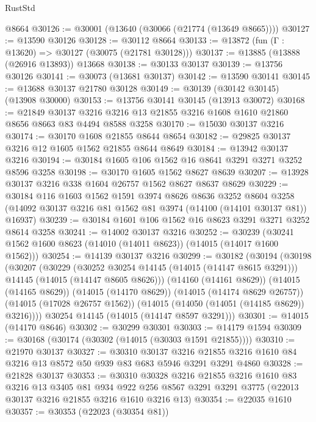 \begin{lexlean}{RustStd}
\begin{coremodule}
    @8664
@30126 := @30001 (@13640 (@30066 (@21774 (@13649 @8665))))
@30127 := @13590 @30126
@30128 := @30112 @8664
@30133 := @13872 (fun (Γ : @13620) => @30127 (@30075 (@21781 @30128)))
@30137 := @13885 (@13888 (@26916 @13893)) @13668
@30138 := @30133 @30137
@30139 := @13756 @30126
@30141 := @30073 (@13681 @30137)
@30142 := @13590 @30141
@30145 := @13688 @30137 @21780 @30128
@30149 := @30139 (@30142 @30145) (@13908 @30000)
@30153 := @13756 @30141 @30145 (@13913 @30072)
@30168 := @21849
    @30137
    @3216
    @3216
    @13
    @21855
    @3216
    @1608
    @1610
    @21860
    @8656
    @8663
    @83
    @4494
    @8588
    @3258
@30170 := @15030 @30137 @3216
@30174 := @30170 @1608 @21855 @8644 @8654
@30182 := @29825 @30137 @3216 @12 @1605 @1562 @21855 @8644 @8649
@30184 := @13942 @30137 @3216
@30194 := @30184 @1605 @106 @1562 @16 @8641 @3291 @3271 @3252 @8596 @3258
@30198 := @30170 @1605 @1562 @8627 @8639
@30207 := @13928 @30137 @3216 @338 @1604 @26757 @1562 @8627 @8637 @8629
@30229 := @30184
    @116
    @1603
    @1562
    @1591
    @3974
    @8626
    @8636
    @3252
    @8604
    @3258
    (@14092 @30137 @3216 @81 @1562 @81 @3974 (@14100 (@14101 @30137 @81)) @16937)
@30239 := @30184 @1601 @106 @1562 @16 @8623 @3291 @3271 @3252 @8614 @3258
@30241 := @14002 @30137 @3216
@30252 := @30239 (@30241 @1562 @1600 @8623 (@14010 (@14011 @8623)) (@14015 (@14017 @1600 @1562)))
@30254 := @14139 @30137 @3216
@30299 := @30182
    (@30194
      (@30198
        (@30207
          (@30229
            (@30252 @30254 @14145 (@14015 (@14147 @8615 @3291)))
            @14145
            (@14015 (@14147 @8605 @8626)))
          (@14160 (@14161 @8629))
          (@14015 (@14165 @8629))
          (@14015 (@14170 @8629))
          (@14015 (@14174 @8629 @26757))
          (@14015 (@17028 @26757 @1562))
          (@14015 (@14050 (@14051 (@14185 @8629)) @3216))))
      @30254
      @14145
      (@14015 (@14147 @8597 @3291)))
@30301 := @14015 (@14170 @8646)
@30302 := @30299 @30301
@30303 := @14179 @1594
@30309 := @30168 (@30174 (@30302 (@14015 (@30303 @1591 @21855))))
@30310 := @21970 @30137
@30327 := @30310
    @30137
    @3216
    @21855
    @3216
    @1610
    @84
    @3216
    @13
    @8572
    @50
    @939
    @83
    @683
    @5946
    @3291
    @3291
    @4860
@30328 := @21828 @30137
@30353 := @30310
    @30328
    @3216
    @21855
    @3216
    @1610
    @83
    @3216
    @13
    @3405
    @81
    @934
    @922
    @256
    @8567
    @3291
    @3291
    @3775
    (@22013 @30137 @3216 @21855 @3216 @1610 @3216 @13)
@30354 := @22035 @1610
@30357 := @30353 (@22023 (@30354 @81))

\end{coremodule}
\end{lexlean}
